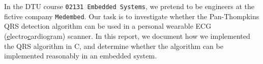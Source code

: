In the DTU course \texttt{02131 Embedded Systems}, we pretend to be engineers at the fictive company \texttt{Medembed}. Our task is to investigate whether the Pan-Thompkins QRS detection algorithm can be used in a personal wearable ECG (\underline{e}lectro\underline{c}ardio\underline{g}ram) scanner. In this report, we document how we implemented the QRS algorithm in C, and determine whether the algorithm can be implemented reasonably in an embedded system.